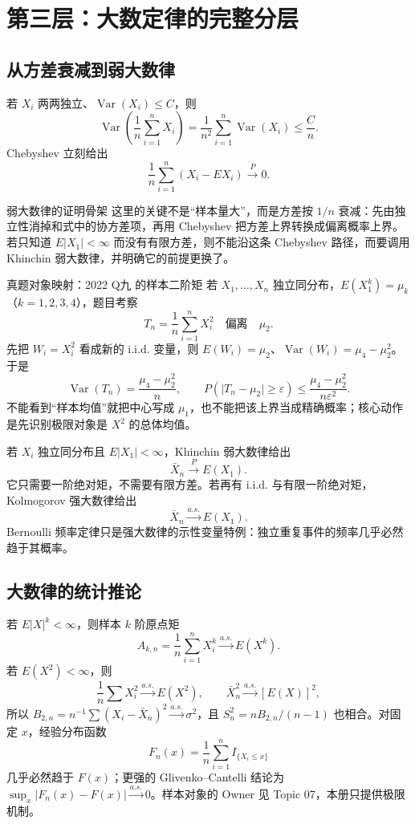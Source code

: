 \documentclass[11pt,a4paper]{ctexart}
\begin{document}
\section{第三层：大数定律的完整分层}

\subsection{从方差衰减到弱大数律}

若 $X_i$ 两两独立、$\operatorname{Var}(X_i)\leq C$，则
\[
\operatorname{Var}\left(\frac1n\sum_{i=1}^nX_i\right)
=\frac1{n^2}\sum_{i=1}^n\operatorname{Var}(X_i)\leq\frac Cn.
\]
Chebyshev 立刻给出
\[
\frac1n\sum_{i=1}^n(X_i-EX_i)\xrightarrow{P}0.
\]
\begin{methodbox}{弱大数律的证明骨架}
这里的关键不是“样本量大”，而是方差按 $1/n$ 衰减：先由独立性消掉和式中的协方差项，再用 Chebyshev 把方差上界转换成偏离概率上界。若只知道 $E\lvert X_1\rvert<\infty$ 而没有有限方差，则不能沿这条 Chebyshev 路径，而要调用 Khinchin 弱大数律，并明确它的前提更换了。
\end{methodbox}

\begin{examplebox}{真题对象映射：2022 Q九 的样本二阶矩}
若 $X_1,\ldots,X_n$ 独立同分布，$E(X_1^k)=\mu_k$（$k=1,2,3,4$），题目考察
\[
T_n=\frac1n\sum_{i=1}^nX_i^2
\quad\text{偏离}\quad \mu_2.
\]
先把 $W_i=X_i^2$ 看成新的 i.i.d. 变量，则 $E(W_i)=\mu_2$、$\operatorname{Var}(W_i)=\mu_4-\mu_2^2$。于是
\[
\operatorname{Var}(T_n)=\frac{\mu_4-\mu_2^2}{n},
\qquad
P(\lvert T_n-\mu_2\rvert\ge\varepsilon)\le
\frac{\mu_4-\mu_2^2}{n\varepsilon^2}.
\]
不能看到“样本均值”就把中心写成 $\mu_1$，也不能把该上界当成精确概率；核心动作是先识别极限对象是 $X^2$ 的总体均值。
\end{examplebox}
若 $X_i$ 独立同分布且 $E\lvert X_1\rvert<\infty$，Khinchin 弱大数律给出
\[
\bar X_n\xrightarrow{P}E(X_1).
\]
它只需要一阶绝对矩，不需要有限方差。若再有 i.i.d. 与有限一阶绝对矩，Kolmogorov 强大数律给出
\[
\boxed{\bar X_n\xrightarrow{a.s.}E(X_1)}.
\]
Bernoulli 频率定律只是强大数律的示性变量特例：独立重复事件的频率几乎必然趋于其概率。

\subsection{大数律的统计推论}

若 $E\lvert X\rvert^k<\infty$，则样本 $k$ 阶原点矩
\[
A_{k,n}=\frac1n\sum_{i=1}^nX_i^k\xrightarrow{a.s.}E(X^k).
\]
若 $E(X^2)<\infty$，则
\[
\frac1n\sum X_i^2\xrightarrow{a.s.}E(X^2),\qquad \bar X_n^2\xrightarrow{a.s.}[E(X)]^2,
\]
所以 $B_{2,n}=n^{-1}\sum(X_i-\bar X_n)^2\xrightarrow{a.s.}\sigma^2$，且 $S_n^2=nB_{2,n}/(n-1)$ 也相合。对固定 $x$，经验分布函数
\[
F_n(x)=\frac1n\sum_{i=1}^nI_{\{X_i\le x\}}
\]
几乎必然趋于 $F(x)$；更强的 Glivenko--Cantelli 结论为 $\sup_x\lvert F_n(x)-F(x)\rvert\xrightarrow{a.s.}0$。样本对象的 Owner 见 Topic 07，本册只提供极限机制。
\end{document}
